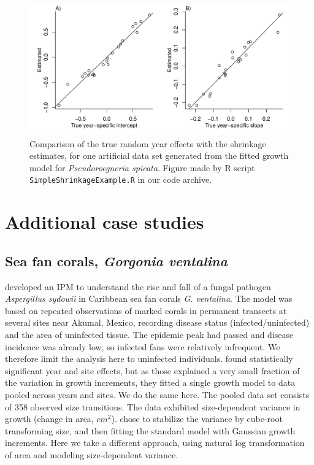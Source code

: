 \documentclass[12pt]{article}
\begin{document}
\begin{spacing}{1.35}
	\begin{figure}[tbp]
		\centerline{\includegraphics[width=\textwidth]{figures/SimpleShrinkage.pdf}}
		\caption{Comparison of the true random year effects with the shrinkage estimates, for one artificial data set
			generated from the fitted growth model for  \emph{Pseudoroegneria spicata}. Figure made by R script 
			\texttt{SimpleShrinkageExample.R} in our code archive.} 
		\label{fig:compareShrinkage}
	\end{figure}
	
	
	\section{Additional case studies}
	\label{sec:moreCases}
	
	\subsection{Sea fan corals, \emph{Gorgonia ventalina}}
	\label{sec:seafans}
	\cite{bruno-etal-2011} developed an IPM to understand the rise and fall of a fungal pathogen \emph{Aspergillus sydowii} in Caribbean sea fan corals \emph{G. ventalina}. 
	The model was based on repeated observations of marked corals in permanent transects at several sites near Akumal, Mexico, recording disease status (infected/uninfected) and the area of uninfected tissue. 
	The epidemic peak had passed and disease incidence was already low, so infected fans were relatively infrequent. 
	We therefore limit the analysis here to uninfected individuals.
	\citet{bruno-etal-2011} found statistically significant year and site effects, but as those explained a very small fraction of the variation in growth increments, they fitted a single growth model to data pooled across years and sites. 
	We do the same here. 
	The pooled data set consists of 358 observed size transitions. 
	The data exhibited size-dependent variance in growth (change in area, $cm^2$).  
	\cite{bruno-etal-2011} chose to stabilize the variance by cube-root transforming size, and then fitting the standard model with Gaussian growth increments. 
	Here we take a different approach, using natural log transformation of area and modeling size-dependent variance. 
	

\end{spacing}
\end{document}
